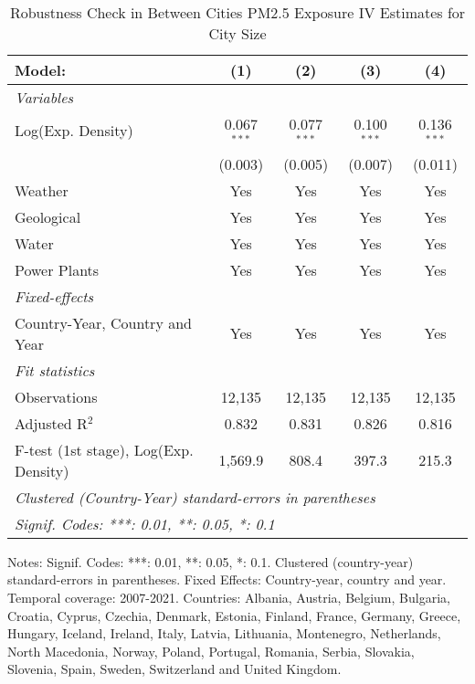 
\begin{table}[htbp]
   \caption{\label{tab:iv_size_rob1} Robustness Check in Between Cities PM2.5 Exposure IV Estimates for City Size}
   \centering
   \small
   \begin{tabular}{lcccc}
      \tabularnewline \midrule \midrule
      Model:                                & (1)           & (2)           & (3)           & (4)\\  
      \midrule
      \emph{Variables}\\
      Log(Exp. Density)                     & 0.067$^{***}$ & 0.077$^{***}$ & 0.100$^{***}$ & 0.136$^{***}$\\   
                                            & (0.003)       & (0.005)       & (0.007)       & (0.011)\\   
      Weather                               & Yes           & Yes           & Yes           & Yes\\  
      Geological                            & Yes           & Yes           & Yes           & Yes\\  
      Water                                 & Yes           & Yes           & Yes           & Yes\\  
      Power Plants                          & Yes           & Yes           & Yes           & Yes\\  
      \midrule
      \emph{Fixed-effects}\\
      Country-Year, Country and Year        & Yes           & Yes           & Yes           & Yes\\  
      \midrule
      \emph{Fit statistics}\\
      Observations                          & 12,135        & 12,135        & 12,135        & 12,135\\  
      Adjusted R$^2$                        & 0.832         & 0.831         & 0.826         & 0.816\\  
      F-test (1st stage), Log(Exp. Density) & 1,569.9       & 808.4         & 397.3         & 215.3\\  
      \midrule \midrule
      \multicolumn{5}{l}{\emph{Clustered (Country-Year) standard-errors in parentheses}}\\
      \multicolumn{5}{l}{\emph{Signif. Codes: ***: 0.01, **: 0.05, *: 0.1}}\\
   \end{tabular}
   
   \par \raggedright 
   Notes: Signif. Codes: ***: 0.01, **: 0.05, *: 0.1. Clustered (country-year) standard-errors in parentheses. Fixed Effects: Country-year, country and year. Temporal coverage: 2007-2021. Countries: Albania, Austria, Belgium, Bulgaria, Croatia, Cyprus, Czechia, Denmark, Estonia, Finland, France, Germany, Greece, Hungary, Iceland, Ireland, Italy, Latvia, Lithuania, Montenegro, Netherlands, North Macedonia, Norway, Poland, Portugal, Romania, Serbia, Slovakia, Slovenia, Spain, Sweden, Switzerland and United Kingdom.
\end{table}


